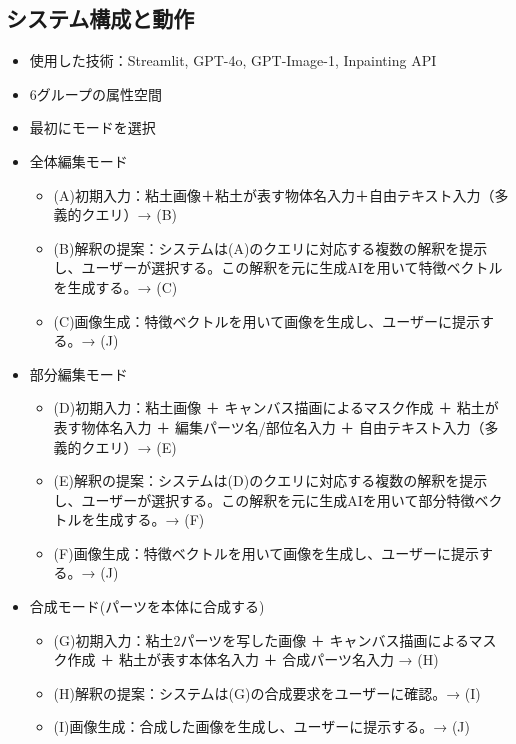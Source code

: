 \documentclass[dvipdfmx]{jlreq}
\begin{document}
\subsection{システム構成と動作}
\begin{itemize}
  \item 使用した技術：Streamlit, GPT-4o, GPT-Image-1, Inpainting API
  \item 6グループの属性空間
  \item 最初にモードを選択
  \item 全体編集モード
  \begin{itemize}
    \item (A)初期入力：粘土画像＋粘土が表す物体名入力＋自由テキスト入力（多義的クエリ）→ (B)
    \item (B)解釈の提案：システムは(A)のクエリに対応する複数の解釈を提示し、ユーザーが選択する。この解釈を元に生成AIを用いて特徴ベクトルを生成する。→ (C)
    \item (C)画像生成：特徴ベクトルを用いて画像を生成し、ユーザーに提示する。→ (J)
  \end{itemize}
  \item 部分編集モード
  \begin{itemize}
    \item (D)初期入力：粘土画像 ＋ キャンバス描画によるマスク作成 ＋ 粘土が表す物体名入力 ＋ 編集パーツ名/部位名入力 ＋ 自由テキスト入力（多義的クエリ）→ (E)
    \item (E)解釈の提案：システムは(D)のクエリに対応する複数の解釈を提示し、ユーザーが選択する。この解釈を元に生成AIを用いて部分特徴ベクトルを生成する。→ (F)
    \item (F)画像生成：特徴ベクトルを用いて画像を生成し、ユーザーに提示する。→ (J)
  \end{itemize}
  \item 合成モード(パーツを本体に合成する)
  \begin{itemize}
    \item (G)初期入力：粘土2パーツを写した画像 ＋ キャンバス描画によるマスク作成 ＋ 粘土が表す本体名入力 ＋ 合成パーツ名入力 → (H)
    \item (H)解釈の提案：システムは(G)の合成要求をユーザーに確認。→ (I)
    \item (I)画像生成：合成した画像を生成し、ユーザーに提示する。→ (J)
  \end{itemize}

\end{itemize}
\end{document}
